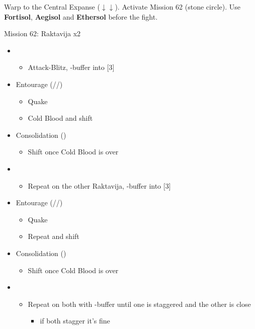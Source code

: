 \renewcommand{\first}{[1] Ruthless (\com/\rav/\sab)}
\renewcommand{\second}{[2] Diversity (\com/\rav/\med)}
\renewcommand{\third}{[3] Entourage (\rav/\sen/\med)}
\renewcommand{\sixth}{[6] Consolidation (\sen\sen\med)}

Warp to the Central Expanse ($\downarrow\downarrow$).
Activate Mission 62 (stone circle).
Use \textbf{Fortisol}, \textbf{Aegisol} and \textbf{Ethersol} before the fight.

\begin{battle}{Mission 62: Raktavija x2}
	\begin{itemize}
		\item \fourth
			\begin{itemize}
				\item Attack-Blitz, \rav-buffer into [3]
			\end{itemize}
		\item \third
			\begin{itemize}
				\item Quake
				\item Cold Blood and shift
			\end{itemize}
		\item \sixth
			\begin{itemize}
				\item Shift once Cold Blood is over
			\end{itemize}
		\item \fourth
			\begin{itemize}
				\item Repeat on the other Raktavija, \rav-buffer into [3]
			\end{itemize}
		\item \third
			\begin{itemize}
				\item Quake
				\item Repeat and shift
			\end{itemize}
		\item \sixth
			\begin{itemize}
				\item Shift once Cold Blood is over
			\end{itemize}
		\item \fourth
			\begin{itemize}
				\item Repeat on both with \rav-buffer until one is staggered and the other is close
					\begin{itemize}
						\item if both stagger it's fine

\end{itemize}
\end{itemize}
\end{itemize}
\end{battle}
